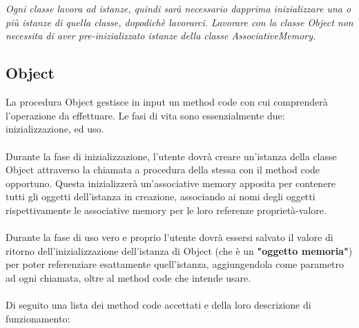 \documentclass[a4paper]{article}
\begin{document}
\\\\
\textit{Ogni classe lavora ad istanze, quindi sarà necessario dapprima inizializzare una o più istanze di quella classe, dopodichè lavorarci. Lavorare con la classe Object non necessita di aver pre-inizializzato istanze della classe AssociativeMemory.}


\subsection{Object}
La procedura Object gestisce in input un method code con cui comprenderà l'operazione da effettuare. Le fasi di vita sono essenzialmente due: inizializzazione, ed uso.
\\\\
Durante la fase di inizializzazione, l'utente dovrà creare un'istanza della classe Object attraverso la chiamata a procedura della stessa con il method code opportuno. Questa inizializzerà un'associative memory apposita per contenere tutti gli oggetti dell'istanza in creazione, associando ai nomi degli oggetti rispettivamente le associative memory per le loro referenze proprietà-valore.
\\\\
Durante la fase di uso vero e proprio l'utente dovrà essersi salvato il valore di ritorno dell'inizializzazione dell'istanza di Object (che è un \textbf{"oggetto memoria"}) per poter referenziare esattamente quell'istanza, aggiungendola come parametro ad ogni chiamata, oltre al method code che intende usare.
\\\\
Di seguito una lista dei method code accettati e della loro descrizione di funzionamento:
\\\\
\end{document}

